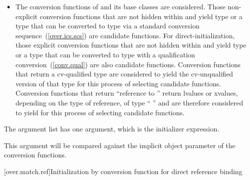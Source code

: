 \begin{itemize}
\item
The conversion functions of
and its base classes are considered.
Those non-explicit conversion functions that are not hidden
within
and yield type
or a type that can be converted to type
via a standard conversion sequence~(\ref{over.ics.scs})
are candidate functions.
For direct-initialization, those explicit conversion functions that are not
hidden within  and yield type  or a type that can be converted
to type  with a qualification conversion~(\ref{conv.qual}) are also
candidate functions.
Conversion functions that return a cv-qualified type
are considered to yield the cv-unqualified version of that type
for this process of selecting candidate functions.
Conversion functions that return ``reference to
''
return
lvalues or xvalues, depending on the type of reference, of type
``
''
and are therefore considered to yield
for this
process of selecting candidate functions.
\end{itemize}

\pnum
The argument list has one argument, which is the initializer expression.
\begin{note}
This argument will be compared against
the implicit object parameter of the conversion functions.
\end{note}

[over.match.ref]{Initialization by conversion function for direct reference binding}%

